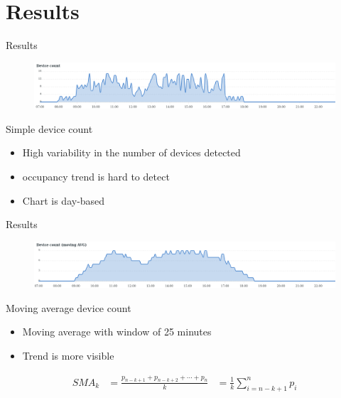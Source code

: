 \documentclass{beamer}
\begin{document}
\section{Results}
\begin{frame}{Results}
	\begin{figure}
		\centering
		\includegraphics[width=1\textwidth]{images/c1wdhap3.png}
	\end{figure}
	\begin{block}
		{Simple device count}
		\begin{itemize}
			\item High variability in the number of devices detected
			\item occupancy trend is hard to detect
			\item Chart is day-based
		\end{itemize}
	\end{block}
\end{frame}

\begin{frame}{Results}
	\begin{figure}
		\centering
		\includegraphics[width=1\textwidth]{images/tp0w3w99f.png}
	\end{figure}
	\begin{block}
		{Moving average device count}
		\begin{itemize}
			\item Moving average with window of 25 minutes
			\item Trend is more visible
		\end{itemize}
		\vspace{1.5em}
		\small{
			\begin{equation}
				{\displaystyle {\begin{aligned}{\textit {SMA}}_{k}&={\frac {p_{n-k+1}+p_{n-k+2}+\cdots +p_{n}}{k}}&={\frac {1}{k}}\sum _{i=n-k+1}^{n}p_{i}\end{aligned}}}
			\end{equation}
		}
	\end{block}
\end{frame}
\end{document}
